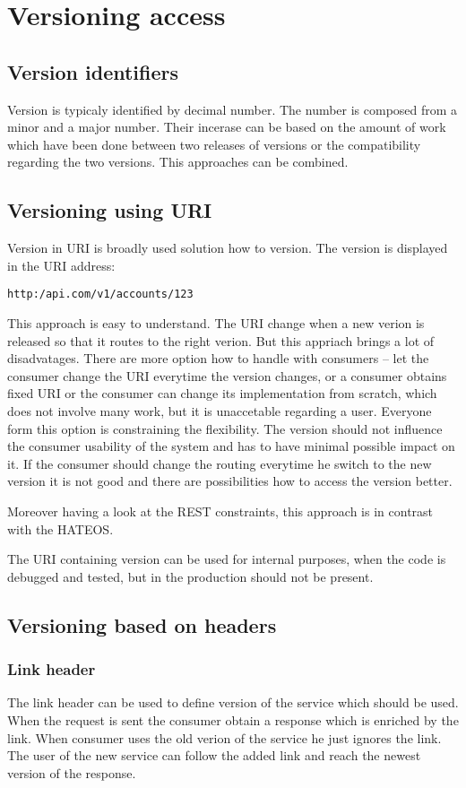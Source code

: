 \chapter{Versioning access}
\label{chap:versionaccess}


\section{Version identifiers}
Version is typicaly identified by decimal number. The number is composed from a minor and a major number. Their incerase can be based on the amount of work which have been done between two releases of versions or the compatibility regarding the two versions. This approaches can be combined.

\section{Versioning using URI}
Version in URI is broadly used solution how to version. The version is displayed in the URI address:

\texttt{http:/api.com/v1/accounts/123}

This approach is easy to understand. The URI change when a new verion is released so that it routes to the right verion. But this appriach brings a lot of disadvatages. There are more option how to handle with consumers -- let the consumer change the URI everytime the version changes, or a consumer obtains fixed URI or the consumer can change its implementation from scratch, which does not involve many work, but it is unaccetable regarding a user.
Everyone form this option is constraining the flexibility.
The version should not influence the consumer usability of the system and has to have minimal possible impact on it. If the consumer should change the routing everytime he switch to the new version it is not good and there are possibilities how to access the version better.

Moreover having a look at the REST constraints, this approach is in contrast with the HATEOS. %

The URI containing version can be used for internal purposes, when the code is debugged and tested, but in the production should not be present.

\section{Versioning based on headers}
\subsection{Link header}
The link header can be used to define version of the service which should be used. When the request is sent the consumer obtain a response which is enriched by the link. When consumer uses the old verion of the service he just ignores the link. The user of the new service can follow the added link and reach the newest version of the response.

